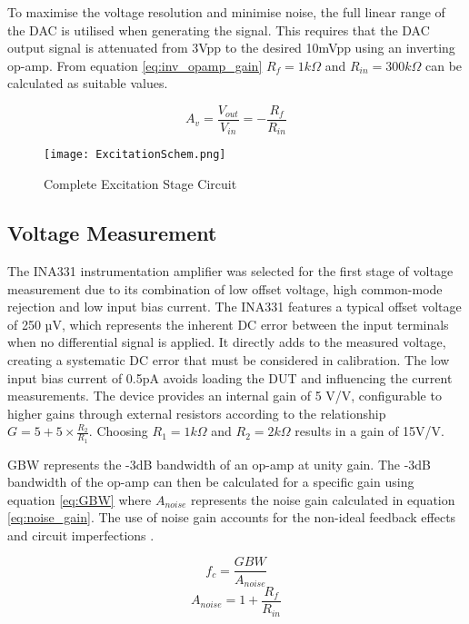 To maximise the voltage resolution and minimise noise, the full linear range of the DAC is utilised when generating the signal. This requires that the DAC output signal is attenuated from 3Vpp to the desired 10mVpp using an inverting op-amp. From equation \ref{eq:inv_opamp_gain} $R_{f}=1k\Omega$ and $R_{in}=300k\Omega$ can be calculated as suitable values.

\begin{equation}
    A_v = \frac{V_{out}}{V_{in}} = -\frac{R_f}{R_{in}}
    \label{eq:inv_opamp_gain}
\end{equation}

\begin{figure}[]
    \centering
    \texttt{[image: ExcitationSchem.png]}
    \caption{Complete Excitation Stage Circuit}
    \label{fig:excitation_stage_circuit}
\end{figure}

\subsection{Voltage Measurement}
The INA331 instrumentation amplifier was selected for the first stage of voltage measurement due to its combination of low offset voltage, high common-mode rejection and low input bias current. The INA331 features a typical offset voltage of 250 µV, which represents the inherent DC error between the input terminals when no differential signal is applied. It directly adds to the measured voltage, creating a systematic DC error that must be considered in calibration. The low input bias current of 0.5pA avoids loading the DUT and influencing the current measurements. The device provides an internal gain of 5 V/V, configurable to higher gains through external resistors according to the relationship $G = 5 + 5\times \frac{R_2}{R_1}$. Choosing $R_1=1k\Omega$ and $R_2=2k\Omega$ results in a gain of 15V/V. 

\Ac{GBW} represents the -3dB bandwidth of an op-amp at unity gain. The -3dB bandwidth of the op-amp can then be calculated for a specific gain using equation \ref{eq:GBW} where $A_{noise}$ represents the noise gain calculated in equation \ref{eq:noise_gain}. The use of noise gain accounts for the non-ideal feedback effects and circuit imperfections \cite{fiore53GainBandwidthProduct2018}.

\begin{equation}
    f_c = \frac{GBW}{A_{noise}}
    \label{eq:GBW}
\end{equation}
\begin{equation}
    A_{noise} = 1 + \frac{R_f}{R_{in}}
    \label{eq:noise_gain}
\end{equation}

